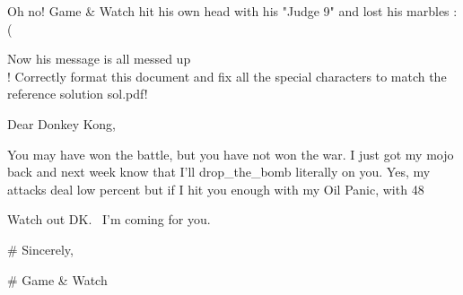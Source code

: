 
Oh no! Game & Watch hit his own head with his "Judge  9" and lost his marbles :(

Now his message is all messed up\\! Correctly format this document and fix all the special characters to match the reference solution sol.pdf!

Dear Donkey Kong,

You may have won the battle, but you have not won the war.
I just got my mojo back and next week know that I'll drop_the_bomb {literally} on you.
Yes, my attacks deal low percent but if I hit you enough with my Oil Panic, with 48%

Watch out DK. ~I'm coming for you.~

# Sincerely,

# Game & Watch


